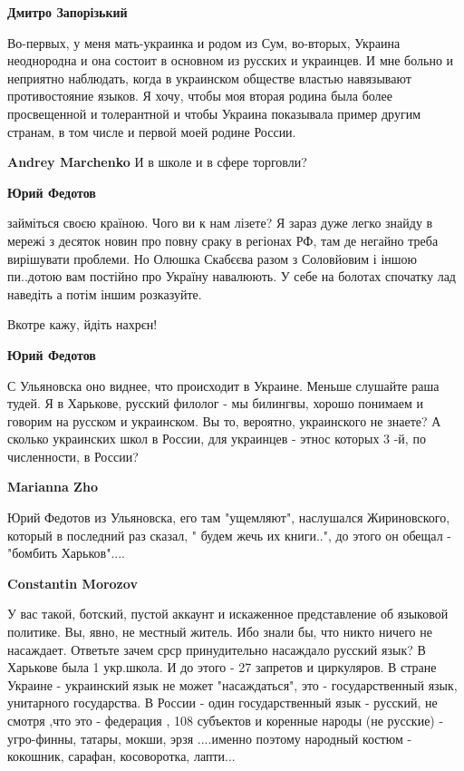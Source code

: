 \begin{itemize}
\begin{itemize}
\textbf{Дмитро Запорізький} 

Во-первых, у меня мать-украинка и родом из Сум, во-вторых, Украина неоднородна и
она состоит в основном из русских и украинцев. И мне больно и неприятно
наблюдать, когда в украинском обществе властью навязывают противостояние
языков. Я хочу, чтобы моя вторая родина была более просвещенной и толерантной и
чтобы Украина показывала пример другим странам, в том числе и первой моей родине
России.

\textbf{Andrey Marchenko} И в школе и в сфере торговли?

\textbf{Юрий Федотов} 

займіться своєю країною. Чого ви к нам лізете? Я зараз дуже легко знайду в
мережі з десяток новин про повну сраку в регіонах РФ, там де негайно треба
вирішувати проблеми. Но Олюшка Скабєєва разом з Соловйовим і іншою пи..дотою
вам постійно про Україну навалюють. У себе на болотах спочатку лад наведіть а
потім іншим розказуйте.

Вкотре кажу, йдіть нахрєн!

\textbf{Юрий Федотов} 

С Ульяновска оно виднее, что происходит в Украине. Меньше слушайте раша тудей.
Я в Харькове, русский филолог - мы билингвы, хорошо понимаем и говорим на
русском и украинском. Вы то, вероятно, украинского не знаете? А сколько
украинских школ в России, для украинцев - этнос которых 3 -й, по численности, в
России?


\textbf{Marianna Zho} 

Юрий Федотов из Ульяновска, его там "ущемляют", наслушался Жириновского,
который в последний раз сказал, " будем жечь их книги..", до этого он обещал
-"бомбить Харьков"....


\textbf{Constantin Morozov} 

У вас такой, ботский, пустой аккаунт и искаженное представление об языковой
политике. Вы, явно, не местный житель. Ибо знали бы, что никто ничего не
насаждает. Ответьте зачем срср принудительно насаждало русский язык? В Харькове
была 1 укр.школа. И до этого - 27 запретов и циркуляров. В стране Украине -
украинский язык не может "насаждаться", это - государственный язык, унитарного
государства. В России - один государственный язык - русский, не смотря ,что это
- федерация , 108 субъектов и коренные народы (не русские) - угро-финны,
татары, мокши, эрзя ....именно поэтому народный костюм - кокошник, сарафан,
косоворотка, лапти...


\end{itemize}
\end{itemize}
